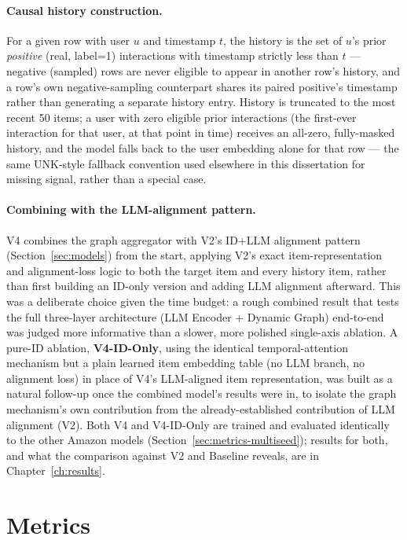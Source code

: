 \paragraph{Causal history construction.} For a given row with user $u$ and timestamp $t$, the history is the set of $u$'s prior \emph{positive} (real, label=1) interactions with timestamp strictly less than $t$ --- negative (sampled) rows are never eligible to appear in another row's history, and a row's own negative-sampling counterpart shares its paired positive's timestamp rather than generating a separate history entry. History is truncated to the most recent 50 items; a user with zero eligible prior interactions (the first-ever interaction for that user, at that point in time) receives an all-zero, fully-masked history, and the model falls back to the user embedding alone for that row --- the same UNK-style fallback convention used elsewhere in this dissertation for missing signal, rather than a special case.

\paragraph{Combining with the LLM-alignment pattern.} V4 combines the graph aggregator with V2's ID+LLM alignment pattern (Section~\ref{sec:models}) from the start, applying V2's exact item-representation and alignment-loss logic to both the target item and every history item, rather than first building an ID-only version and adding LLM alignment afterward. This was a deliberate choice given the time budget: a rough combined result that tests the full three-layer architecture (LLM Encoder + Dynamic Graph) end-to-end was judged more informative than a slower, more polished single-axis ablation. A pure-ID ablation, \textbf{V4-ID-Only}, using the identical temporal-attention mechanism but a plain learned item embedding table (no LLM branch, no alignment loss) in place of V4's LLM-aligned item representation, was built as a natural follow-up once the combined model's results were in, to isolate the graph mechanism's own contribution from the already-established contribution of LLM alignment (V2). Both V4 and V4-ID-Only are trained and evaluated identically to the other Amazon models (Section~\ref{sec:metrics-multiseed}); results for both, and what the comparison against V2 and Baseline reveals, are in Chapter~\ref{ch:results}.

\section{Metrics}
\label{sec:metrics}

